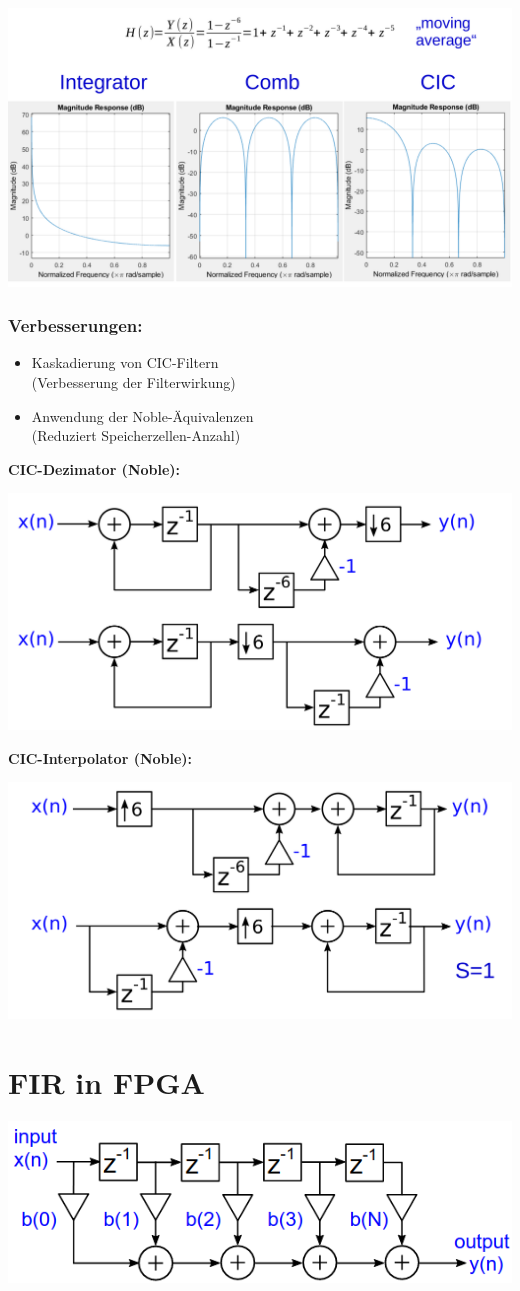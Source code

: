 \documentclass[10pt,a4paper]{article}
\begin{document}
\begin{center}
  \includegraphics[width=.5\textwidth]{./img/Multirate_CIC_Frequenzgang.png}
\end{center} 

\subsubsection{Verbesserungen: }
\begin{itemize}
  \item Kaskadierung von CIC-Filtern \\
  (Verbesserung der Filterwirkung)
  \item Anwendung der Noble-Äquivalenzen\\
   (Reduziert Speicherzellen-Anzahl)
\end{itemize}

\textbf{CIC-Dezimator (Noble): }
\begin{center}
  \includegraphics[width=.4\textwidth]{./img/CIC_Dezimator.png}
\end{center} 

\textbf{CIC-Interpolator (Noble): }
\begin{center}
  \includegraphics[width=.4\textwidth]{./img/CIC_Interpolator.png}
\end{center} 
 
\section{FIR in FPGA}
  \begin{center}
      \includegraphics[width=.35\textwidth]{./img/firfpga.png}
  \end{center}
\end{document}

